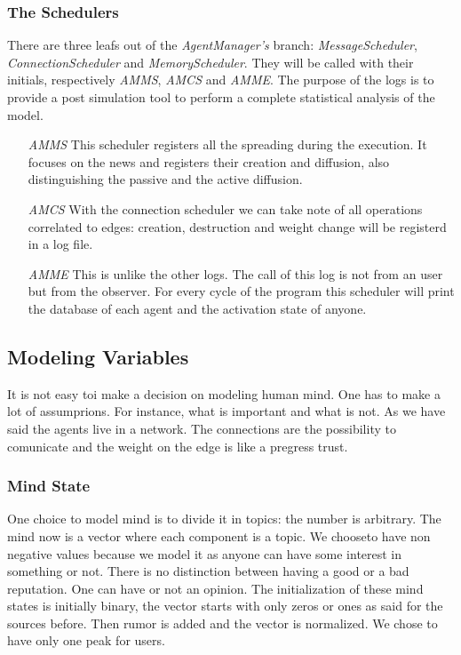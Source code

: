 \subsubsection{The Schedulers}
There are three leafs out of the \textit{AgentManager's} branch:
\textit{MessageScheduler}, \textit{ConnectionScheduler} and
\textit{MemoryScheduler}. They will be called with their initials,
respectively \textit{AMMS}, \textit{AMCS} and \textit{AMME}.
The purpose of the logs is to provide a post simulation tool to perform
a complete statistical analysis of the model. 
\begin{itemize}
\item [\textit{AMMS}] This scheduler registers all the spreading during the
  execution. It focuses on the news and registers their creation and
  diffusion, also distinguishing the passive and the active diffusion.
\item [\textit{AMCS}] With the connection scheduler we can take note of
  all operations correlated to edges: creation, destruction and weight
  change will be registerd in a log file.
\item [\textit{AMME}] This is unlike the other logs. The call of this log is
  not from an user but from the observer. For every cycle of the program
  this scheduler will print the database of each agent and the activation
  state of anyone.
\end{itemize}

\subsection{Modeling Variables}
It is not easy toi make a decision on modeling human mind. One has to make
a lot of assumprions. For instance, what is important and what is not.
As we have said the agents live in a network. The connections are the
possibility to comunicate and the weight on the edge is like a pregress
trust.

\subsubsection{Mind State}
One choice to model mind is to divide it in topics: the number is arbitrary.
The mind now is a vector where each component is a topic. We chooseto have
non negative values because we model it as anyone can have some interest in
something or not. There is no distinction between having a good or a bad
reputation. One can have or not an opinion.
The initialization of these mind states is initially binary, the vector starts
with only zeros or ones as said for the sources before. Then rumor is added
and the vector is normalized. We chose to have only one peak for users.

